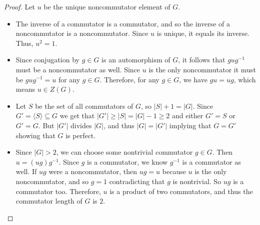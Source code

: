 \documentclass[10pt,a4paper]{amsart}
\begin{document}
\begin{proof} Let $u$ be the unique noncommutator element of $G$.
\begin{itemize}
    \item The inverse of a commutator is a commutator, and so the inverse of a noncommutator is a noncommutator. Since $u$ is unique, it equals its inverse. Thus, $u^2 = 1$.
    \item Since conjugation by $g\in G$ is an automorphism of $G$, it follows that $gug^{-1}$ must be a noncommutator as well. Since $u$ is the only noncommutator it must be $gug^{-1}=u$ for any $g\in G$.  Therefore, for any $g\in G$, we have $gu=ug$, which means $u \in Z(G)$.
    \item Let $S$ be the set of all commutators of $G$, so $|S|+1=|G|$. Since $G'=\langle S \rangle\subseteq G$ we get that $|G'|\geq |S| = |G|-1\geq 2$ and either $G'=S$ or $G'=G$. But $|G'|$ divides $|G|$, and thus $|G|=|G'|$ implying that $G=G'$ showing that $G$ is perfect.
    \item Since $|G| > 2$, we can choose some nontrivial commutator $g\in G$. Then $u=(ug)g^{-1}$. Since $g$ is a commutator, we know $g^{-1}$ is a commutator as well. If $ug$ were a noncommutator, then $ug=u$ because $u$ is the only noncommutator, and so $g=1$ contradicting that $g$ is nontrivial. So $ug$ is a commutator too. Therefore, $u$ is a product of two commutators, and thus the commutator length of $G$ is $2$.
\end{itemize}
\end{proof}
\end{document}
